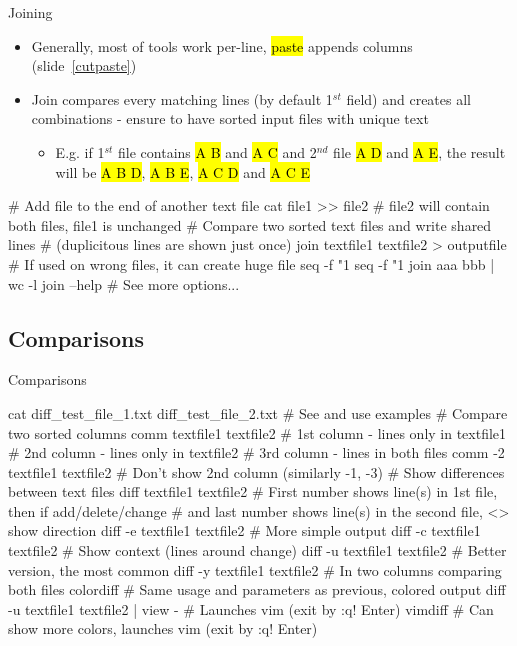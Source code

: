 \documentclass[compress, ucs, xelatex, 11pt, xcolor=svgnames,
  hyperref={
    bookmarks=true,
    unicode=true,
    colorlinks=true,
    pdftitle={Linux, command line and MetaCentrum},
    plainpages=false,
    pdfauthor={Vojtech Zeisek},
    pdfsubject={Course about use of Linux command line, writing shell scripts and using MetaCentrum of CESNET},
    pdfcreator={XeLaTeX},
    pdfkeywords={Linux, GNU, BASH, shell, command line, MetaCentrum},
    linkcolor=DarkRed,
    anchorcolor=DarkBlue,
    citecolor=Indigo,
    filecolor=NavyBlue,
    menucolor=DarkMagenta,
    urlcolor=DarkBlue,
    pdftex},
  url={hyphens, lowtilde} %
  ]{beamer}
\renewcommand{\texttt}[1]{\hl{\ttfamily #1}}
\begin{document}
\begin{frame}[fragile]{Joining}
  \begin{itemize}
    \item Generally, most of tools work per-line, \texttt{paste} appends columns (slide~\ref{cutpaste})
    \item Join compares every matching lines (by default 1$^{st}$ field) and creates all combinations - ensure to have sorted input files with unique text
    \begin{itemize}
      \item E.g. if 1$^{st}$ file contains \texttt{A B} and \texttt{A C} and 2$^{nd}$ file \texttt{A D} and \texttt{A E}, the result will be \texttt{A B D}, \texttt{A B E}, \texttt{A C D} and \texttt{A C E}
    \end{itemize}
  \end{itemize}
  \begin{bashcode}
    # Add file to the end of another text file
    cat file1 >> file2 # file2 will contain both files, file1 is unchanged
    # Compare two sorted text files and write shared lines
    # (duplicitous lines are shown just once)
    join textfile1 textfile2 > outputfile
    # If used on wrong files, it can create huge file
    seq -f "1 %
    seq -f "1 %
    join aaa bbb | wc -l
    join --help # See more options...
  \end{bashcode}
  \vfill
\end{frame}

\subsection{Comparisons}

\begin{frame}[fragile]{Comparisons}
  \begin{bashcode}
    cat diff_test_file_1.txt diff_test_file_2.txt # See and use examples
    # Compare two sorted columns
    comm textfile1 textfile2
      # 1st column - lines only in textfile1
      # 2nd column - lines only in textfile2
      # 3rd column - lines in both files
    comm -2 textfile1 textfile2 # Don't show 2nd column (similarly -1, -3)
    # Show differences between text files
    diff textfile1 textfile2
      # First number shows line(s) in 1st file, then if add/delete/change
      # and last number shows line(s) in the second file, <> show direction
    diff -e textfile1 textfile2 # More simple output
    diff -c textfile1 textfile2 # Show context (lines around change)
    diff -u textfile1 textfile2 # Better version, the most common
    diff -y textfile1 textfile2 # In two columns comparing both files
    colordiff # Same usage and parameters as previous, colored output
    diff -u textfile1 textfile2 | view - # Launches vim (exit by :q! Enter)
    vimdiff # Can show more colors, launches vim (exit by :q! Enter)
  \end{bashcode}
\end{frame}
\end{document}
